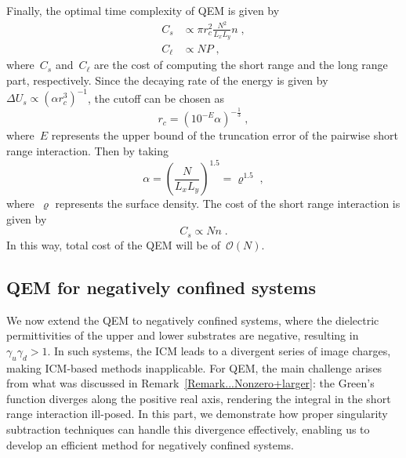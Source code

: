 Finally, the optimal time complexity of QEM is given by
\begin{align}
    C_s & \propto \pi r_c^2 \frac{N^2}{L_x L_y} n\;,\\
    C_\ell & \propto N P\;,
\end{align}
where~$C_s$ and~$C_\ell$ are the cost of computing the short range and the long range part, respectively.
Since the decaying rate of the energy is given by~$\Delta U_s \propto (\alpha r_c^3)^{-1}$, the cutoff can be chosen as
\begin{equation}
    r_c = (10^{-E} \alpha)^{-\frac{1}{3}}\;,
\end{equation}
where~$E$ represents the upper bound of the truncation error of the pairwise short range interaction.
Then by taking
\begin{equation}\label{eq:alphs-select}
    \alpha = \left(\frac{N}{L_x L_y} \right)^{1.5} = {\varrho}^{1.5}\;,
\end{equation}
where~$\varrho$ represents the surface density.
The cost of the short range interaction is given by
\begin{equation}
    C_s \propto  N n\;.
\end{equation}
In this way, total cost of the QEM will be of~$\mathcal{O}(N)$.


\subsection{QEM for negatively confined systems}

We now extend the QEM to negatively confined systems, where the dielectric permittivities of the upper and lower substrates are negative, resulting in~$\gamma_u \gamma_d > 1$. 
In such systems, the ICM leads to a divergent series of image charges, making ICM-based methods inapplicable.
For QEM, the main challenge arises from what was discussed in Remark~\ref{Remark...Nonzero+larger}: the Green's function diverges along the positive real axis, rendering the integral in the short range interaction ill-posed.
In this part, we demonstrate how proper singularity subtraction techniques can handle this divergence effectively, enabling us to develop an efficient method for negatively confined systems.

